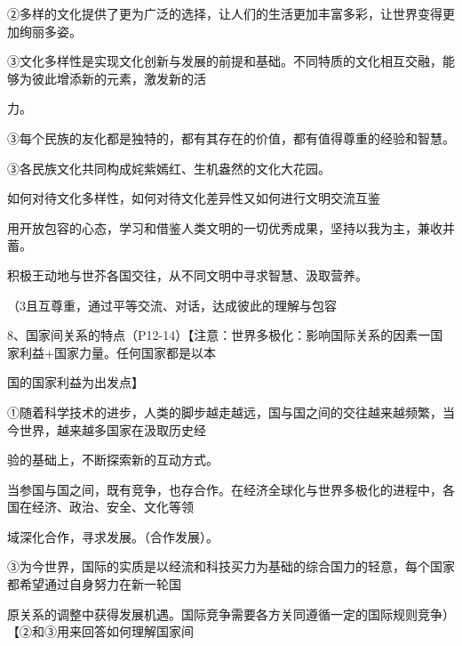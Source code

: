 \documentclass[lang=cn,11pt]{elegantbook}
\newcommand{\daofasym}[1]{{\daofasymbolfont #1}}
\newcommand{\daofasym}[1]{#1}
\begin{document}
\daofasym{②}多样的文化提供了更为广泛的选择，让人们的生活更加丰富多彩，让世界变得更加绚丽多姿。\par

\daofasym{③}文化多样性是实现文化创新与发展的前提和基础。不同特质的文化相互交融，能够为彼此增添新的元素，激发新的活\par

力。\par

\daofasym{③}每个民族的友化都是独特的，都有其存在的价值，都有值得尊重的经验和智慧。\par

\daofasym{③}各民族文化共同构成姹紫嫣红、生机盎然的文化大花园。\par

如何对待文化多样性，如何对待文化差异性又如何进行文明交流互鉴\par

用开放包容的心态，学习和借鉴人类文明的一切优秀成果，坚持以我为主，兼收并蓄。\par

积极王动地与世芥各国交往，从不同文明中寻求智慧、汲取营养。\par

（3且互尊重，通过平等交流、对话，达成彼此的理解与包容\par

8、国家间关系的特点（P12-14）【注意：世界多极化：影响国际关系的因素一国家利益+国家力量。任何国家都是以本\par

国的国家利益为出发点】\par

\daofasym{①}随着科学技术的进步，人类的脚步越走越远，国与国之间的交往越来越频繁，当今世界，越来越多国家在汲取历史经\par

验的基础上，不断探索新的互动方式。\par

当参国与国之间，既有竞争，也存合作。在经济全球化与世界多极化的进程中，各国在经济、政治、安全、文化等领\par

域深化合作，寻求发展。（合作发展）。\par

\daofasym{③}为今世界，国际的实质是以经流和科技买力为基础的综合国力的轻意，每个国家都希望通过自身努力在新一轮国\par

原关系的调整中获得发展机遇。国际竞争需要各方关同遵循一定的国际规则竞争）【\daofasym{②}和\daofasym{③}用来回答如何理解国家间\par
\end{document}
